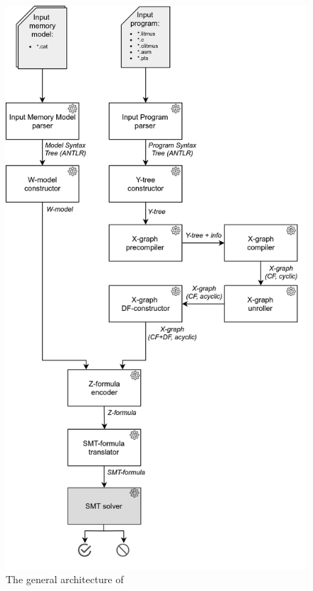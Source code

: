 \begin{figure}%
    \centering
  \includegraphics[height=.99\textheight,keepaspectratio]{img/my/draw.io/general_arch.png}
  \caption{The general architecture of \porthos[2]}
  \label{fig:arch}
\end{figure}

